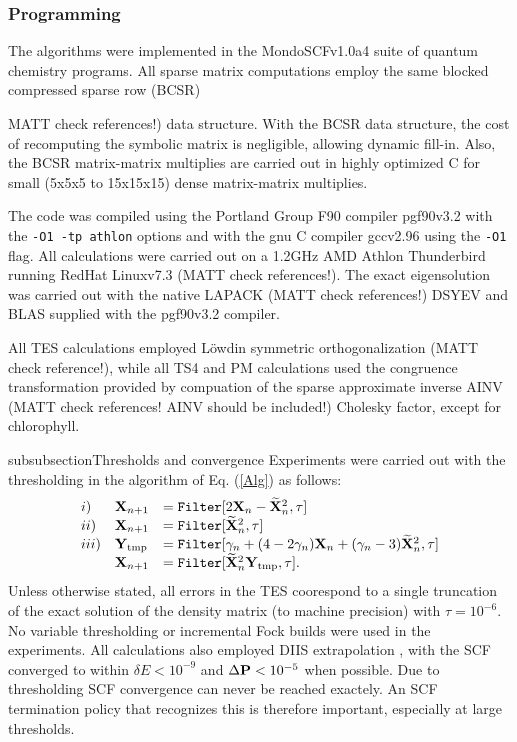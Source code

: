 \commentoutA{\documentclass[prb,aps,twocolumn,twocolumngrid,secnumarabic,superbib,hyperref]{revtex4}}
\begin{document}
\subsubsection{Programming}
The algorithms were implemented in the {\sc MondoSCF}v1.0a4 suite of 
quantum chemistry programs\cite{MondoSCF}.  
All sparse matrix computations employ the same blocked compressed sparse row 
(BCSR)\cite{Challacombe99,MChallacombe00} {MATT check references!) 
data structure.  With the BCSR data structure, the cost of recomputing the symbolic 
matrix is negligible, allowing dynamic fill-in.  Also, the BCSR matrix-matrix multiplies 
are carried out in highly optimized C for small 
(5x5x5 to 15x15x15) dense matrix-matrix multiplies. 

The code was compiled using the 
Portland Group F90 compiler {\sc pgf90}v3.2 \cite{pgf90} with the {\tt -O1 -tp athlon} 
options  and with the gnu C compiler {\sc gcc}v2.96 using the {\tt -O1} flag.  All 
calculations were carried out on a 1.2GHz AMD Athlon Thunderbird running RedHat 
{\sc Linux}v7.3\cite{RedHat73} (MATT check references!).  The exact eigensolution was carried out with the native
{\sc LAPACK} \cite{LAPACK}  (MATT check references!) {\sc DSYEV} and {\sc BLAS} supplied with the {\sc pgf90}v3.2 compiler.

All TES calculations employed L{\"o}wdin symmetric orthogonalization \cite{PLowdin50} (MATT check reference!), 
while all TS4 and PM calculations used the congruence transformation provided by
compuation of the sparse approximate inverse AINV \cite{AINV,MChallacombe02c} 
(MATT check references! AINV should be included!) Cholesky factor, except for chlorophyll.

subsubsection{Thresholds and convergence}
Experiments were carried out with the thresholding in the algorithm of Eq. (\ref{Alg})
as follows:
\begin{equation} 
\begin{array}{lll}
i)    &{\bf X}_{n+1} &= {\tt Filter}[2{\bf X}_n - \widetilde{\bf X}^2_n,\tau] \\
ii)   &{\bf X}_{n+1} &= {\tt Filter}[\widetilde{\bf X}^2_n,\tau] \\
iii)  &{\bf Y}_{\rm tmp}     &= {\tt Filter}[\gamma_n + (4-2\gamma_n){\bf X}_n + (\gamma_n-3)\widetilde{\bf X}^2_n,\tau] \\
      &{\bf X}_{n+1} &= {\tt Filter}[\widetilde{\bf X}^2_n {\bf Y}_{\rm tmp},\tau].
\end{array}
\end{equation}
Unless otherwise stated, all errors in the TES coorespond to a single
truncation of the exact solution of the density matrix (to machine precision) with $\tau=10^{-6}$.
No variable thresholding or incremental Fock builds were used in the experiments. 
All calculations also employed DIIS extrapolation \cite{PPulay88}, with the SCF
converged to within $\delta E < 10^{-9}$ and $\Delta{\bf P} < 10^{-5}$ when possible.
Due to thresholding SCF convergence can never be reached exactely.
An SCF termination policy that recognizes this is therefore important,
especially at large thresholds. 

}
\end{document}
